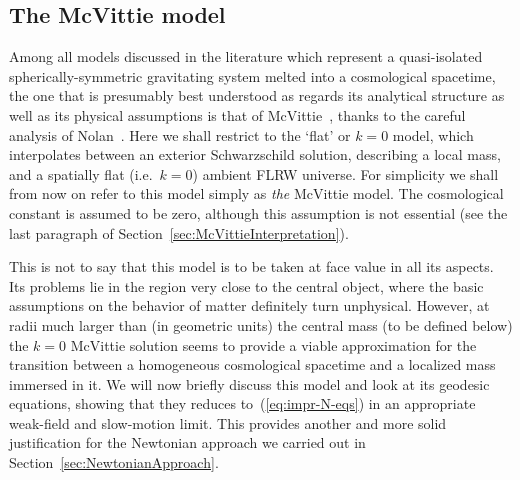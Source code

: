 \documentclass
[rmp,aps,twocolumn,showpacs,preprintnumbers,amsmath,amssymb]{revtex4}
\theoremstyle{plain}
\theoremstyle{definition}
\theoremstyle{remark}
\begin{document}
\subsection{The McVittie model}
\label{sec:McVittieModel}
%
Among all models discussed in the literature which represent a 
quasi-isolated spherically-symmetric gravitating system melted into a 
cosmological spacetime, the one that is presumably best understood as 
regards its analytical structure as well as its physical assumptions is 
that of McVittie~\cite{McVittie:1933}, thanks to the careful analysis 
of Nolan~\cite{Nolan:1998,Nolan:1999a,Nolan:1999b}. Here we shall 
restrict to the `flat' or $k=0$ model, which interpolates between an 
exterior Schwarzschild solution, describing a local mass, and a spatially 
flat (i.e.~$k=0$) ambient FLRW universe. For simplicity we shall from now 
on refer to this model simply as \emph{the} McVittie model. 
The cosmological constant is assumed to be zero, although this 
assumption is not essential (see the last paragraph of 
Section~\ref{sec:McVittieInterpretation}). 

This is not to say that this model is to be taken at face value 
in all its aspects. Its problems lie in the region very close to 
the central object, where the basic assumptions on the behavior 
of matter definitely turn unphysical. However, at radii much 
larger than (in geometric units) the central mass (to be defined 
below) the $k=0$ McVittie solution seems to provide a viable 
approximation for the transition between a homogeneous cosmological 
spacetime and a localized mass immersed in it. We will now briefly 
discuss this model and look at its geodesic equations, showing 
that they reduces to~(\ref{eq:impr-N-eqs}) in an appropriate 
weak-field and slow-motion limit. This provides another and more 
solid justification for the Newtonian approach we carried out in 
Section~\ref{sec:NewtonianApproach}. 
\end{document}
